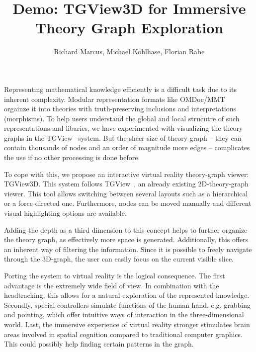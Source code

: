 \documentclass{llncs}
\title{Demo: TGView3D for Immersive Theory Graph Exploration}
\author{Richard Marcus, Michael Kohlhase, Florian Rabe}
\institute{Computer Science, FAU Erlangen-N\"urnberg}
\begin{document}
\maketitle

Representing mathematical knowledge efficiently is a difficult task due to its inherent complexity.
Modular representation formats like OMDoc/MMT~\cite{Kohlhase:OMDoc1.2,RabKoh:WSMSML13} orgainze it into theories with truth-preserving inclusions and interpretations (morphisms).
To help users understand the global and local strucutre of such representations and libaries, we have experimented with visualizing the theory graphs in the TGView~\cite{RupKohMue:fitgv17} system. But the sheer size of theory graph -- they can contain thousands of nodes and an order of magnitude more edges -- complicates the use if no other processing is done before.

To cope with this, we propose an interactive virtual reality theory-graph viewer: TGView3D. This system follows TGView~\cite{RupKohMue:fitgv17}, an already existing 2D-theory-graph viewer. This tool allows switching between several layouts such as a hierarchical or a force-directed one. Furthermore, nodes can be moved manually and different visual highlighting options are available.

Adding the depth as a third dimension to this concept helps to further organize the theory graph, as effectively more space is generated. Additionally, this offers an inherent way of filtering the information. Since it is possible to freely navigate through the 3D-graph, the user can easily focus on the current visible slice.

Porting the system to virtual reality is the logical consequence. The first advantage is the extremely wide field of view. In combination with the headtracking, this allows for a natural exploration of the represented knowledge. Secondly, special controllers simulate functions of the human hand, e.g. grabbing and pointing, which offer intuitive ways of interaction in the three-dimensional world. Last, the immersive experience of virtual reality stronger stimulates brain areas involved in spatial cognition compared to traditional computer graphics. This could possibly help finding certain patterns in the graph.
\end{document}
